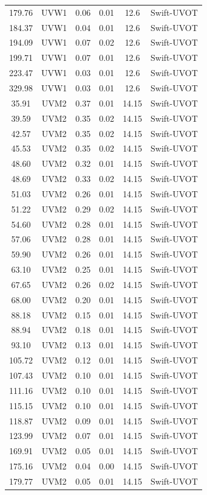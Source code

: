 \documentclass{nature_plusfigure}
\begin{document}
\begin{methods}
\begin{longtable}{|c|c|c|c|c|c|}
179.76&UVW1&0.06&0.01&12.6&Swift{-}UVOT\\%
184.37&UVW1&0.04&0.01&12.6&Swift{-}UVOT\\%
194.09&UVW1&0.07&0.02&12.6&Swift{-}UVOT\\%
199.71&UVW1&0.07&0.01&12.6&Swift{-}UVOT\\%
223.47&UVW1&0.03&0.01&12.6&Swift{-}UVOT\\%
329.98&UVW1&0.03&0.01&12.6&Swift{-}UVOT\\%
35.91&UVM2&0.37&0.01&14.15&Swift{-}UVOT\\%
39.59&UVM2&0.35&0.02&14.15&Swift{-}UVOT\\%
42.57&UVM2&0.35&0.02&14.15&Swift{-}UVOT\\%
45.53&UVM2&0.35&0.02&14.15&Swift{-}UVOT\\%
48.60&UVM2&0.32&0.01&14.15&Swift{-}UVOT\\%
48.69&UVM2&0.33&0.02&14.15&Swift{-}UVOT\\%
51.03&UVM2&0.26&0.01&14.15&Swift{-}UVOT\\%
51.22&UVM2&0.29&0.02&14.15&Swift{-}UVOT\\%
54.60&UVM2&0.28&0.01&14.15&Swift{-}UVOT\\%
57.06&UVM2&0.28&0.01&14.15&Swift{-}UVOT\\%
59.90&UVM2&0.26&0.01&14.15&Swift{-}UVOT\\%
63.10&UVM2&0.25&0.01&14.15&Swift{-}UVOT\\%
67.65&UVM2&0.26&0.02&14.15&Swift{-}UVOT\\%
68.00&UVM2&0.20&0.01&14.15&Swift{-}UVOT\\%
88.18&UVM2&0.15&0.01&14.15&Swift{-}UVOT\\%
88.94&UVM2&0.18&0.01&14.15&Swift{-}UVOT\\%
93.10&UVM2&0.13&0.01&14.15&Swift{-}UVOT\\%
105.72&UVM2&0.12&0.01&14.15&Swift{-}UVOT\\%
107.43&UVM2&0.10&0.01&14.15&Swift{-}UVOT\\%
111.16&UVM2&0.10&0.01&14.15&Swift{-}UVOT\\%
115.15&UVM2&0.10&0.01&14.15&Swift{-}UVOT\\%
118.87&UVM2&0.09&0.01&14.15&Swift{-}UVOT\\%
123.99&UVM2&0.07&0.01&14.15&Swift{-}UVOT\\%
169.91&UVM2&0.05&0.01&14.15&Swift{-}UVOT\\%
175.16&UVM2&0.04&0.00&14.15&Swift{-}UVOT\\%
179.77&UVM2&0.05&0.01&14.15&Swift{-}UVOT\\%

\end{longtable}
\end{methods}
\end{document}
